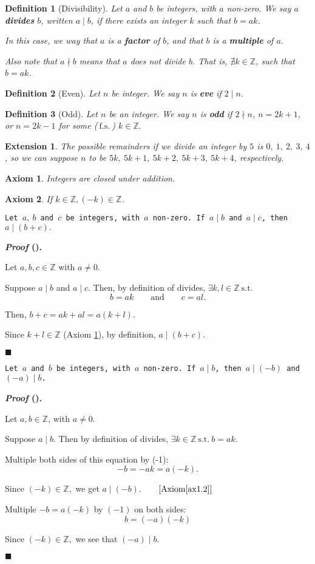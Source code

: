\documentclass[12pt,a4paper]{article}
\newcounter{nprf}[subsection]
\newtheorem{df}{Definition}[subsection]
\newtheorem{ax}{Axiom}[section]
\newenvironment*{prf}{\par\indent\textbf{\textit{Proof} (\stepcounter{nprf}\thenprf). }\par}{\par\hfill $\blacksquare$\par}
\newtheorem*{ext}{\indent Extension}
\def\Z{{\mathbb{Z}}}
\def\st{\ \mathrm{s.t.}\ }
\def\fs{\ \mathrm{f.s.}\ }
\begin{document}
\begin{df}[Divisibility]
	Let $a$ and $b$ be integers, with $a$ non-zero. We say $a$ \textbf{divides} $b$, written $a\mid b$, if there exists an \emph{integer} $k$ such that $b=ak$.
	
	In this case, we way that $a$ is a \textbf{factor} of $b$, and that $b$ is a \textbf{multiple} of $a$.
	
	Also note that $a\nmid b$ means that $a$ does not divide $b$. That is, $\nexists k\in\Z$, such that $b=ak$.
\end{df}
\begin{df}[Even]
	Let $n$ be integer. We say $n$ is \textbf{eve} if $2\mid n$.	
\end{df}
\begin{df}[Odd]
	Let $n$ be an integer. We say $n$ is \textbf{odd} if $2\nmid n$, $n=2k+1$, or $n=2k-1$ for some ($\fs$) $k\in\Z.$	
\end{df}
\begin{ext}
	The possible remainders if we divide an integer by $5$ is $0,\ 1,\ 2,\ 3,\ 4$, so we can suppose $n$ to be $5k,\ 5k+1,\ 5k+2,\ 5k+3,\ 5k+4$, respectively. 	
\end{ext}
\begin{ax}\label{ax1.1}
	Integers are closed under addition.	
\end{ax}
\begin{ax}\label{ax1.2}
	If $k\in\Z, (-k)\in\Z$.
\end{ax}
\begin{framed}
\noindent\texttt{Let $a,\ b$ and $c$ be integers, with $a$ non-zero. If $a\mid b$ and $a\mid c$, then $a\mid (b+c).$}
\begin{prf}
	Let $a,b,c\in\Z$ with $a\neq0$.\par Suppose $a\mid b$ and $a\mid c$. Then, by definition of divides, $\exists k,l\in\Z\st$\[b=ak\qquad\text{and}\qquad c=al.\] \par Then, $b+c=ak+al=a(k+l).$\par Since $k+l\in\Z$ (Axiom \ref{ax1.1}), by definition, $a\mid(b+c).$	
\end{prf}
\end{framed}
\begin{framed}
\noindent\texttt{Let $a$ and $b$ be integers, with $a$ non-zero. If $a\mid b$, then $a\mid(-b)$ and $(-a)\mid b$.}
\begin{prf}
	Let $a,b\in\Z$, with $a\neq0$.\par Suppose $a\mid b$. Then by definition of divides, $\exists k\in\Z\st b=ak.$\par Multiple both sides of this equation by (-1): \[-b=-ak=a(-k).\]\par Since $(-k)\in\Z,$ we get $a\mid (-b)$.$\qquad[\text{Axiom}\ref{ax1.2}]$\par Multiple $-b=a(-k)$ by $(-1)$ on both sides: \[b=(-a)(-k)\]\par Since $(-k)\in\Z,$ we see that $(-a)\mid b.$
\end{prf}	
\end{framed}
\end{document}
